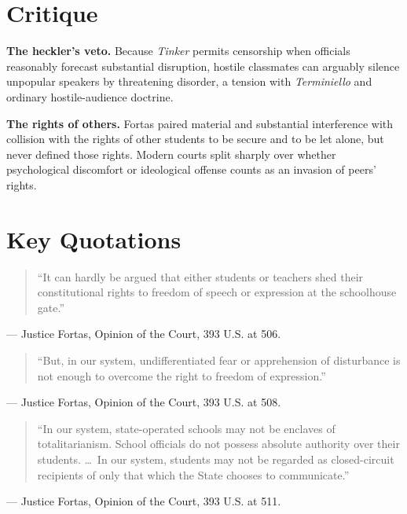 \documentclass[12pt]{article}
\begin{document}
\section{Critique}

\textbf{The heckler's veto.} Because \textit{Tinker} permits censorship when officials reasonably forecast substantial disruption, hostile classmates can arguably silence unpopular speakers by threatening disorder, a tension with \textit{Terminiello} and ordinary hostile-audience doctrine.

\textbf{The rights of others.} Fortas paired material and substantial interference with collision with the rights of other students to be secure and to be let alone, but never defined those rights. Modern courts split sharply over whether psychological discomfort or ideological offense counts as an invasion of peers' rights.

\section{Key Quotations}

\begin{quote}
``It can hardly be argued that either students or teachers shed their constitutional rights to freedom of speech or expression at the schoolhouse gate.''
\end{quote}
\noindent --- Justice Fortas, Opinion of the Court, 393 U.S. at 506.

\begin{quote}
``But, in our system, undifferentiated fear or apprehension of disturbance is not enough to overcome the right to freedom of expression.''
\end{quote}
\noindent --- Justice Fortas, Opinion of the Court, 393 U.S. at 508.

\begin{quote}
``In our system, state-operated schools may not be enclaves of totalitarianism. School officials do not possess absolute authority over their students. \dots\ In our system, students may not be regarded as closed-circuit recipients of only that which the State chooses to communicate.''
\end{quote}
\noindent --- Justice Fortas, Opinion of the Court, 393 U.S. at 511.
\end{document}
